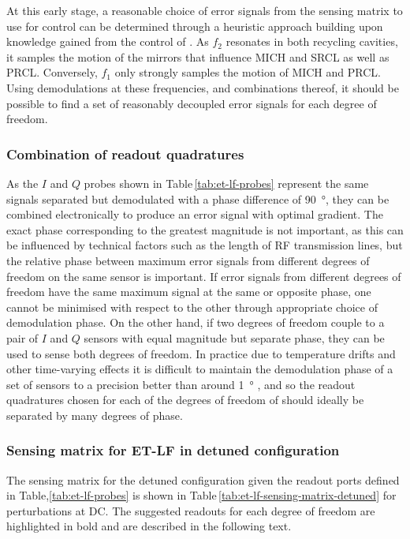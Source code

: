 At this early stage, a reasonable choice of error signals from the sensing matrix to use for control can be determined through a heuristic approach building upon knowledge gained from the control of \ALIGO{}. As $f_2$ resonates in both recycling cavities, it samples the motion of the mirrors that influence \gls{MICH} and \gls{SRCL} as well as \gls{PRCL}. Conversely, $f_1$ only strongly samples the motion of \gls{MICH} and \gls{PRCL}. Using demodulations at these frequencies, and combinations thereof, it should be possible to find a set of reasonably decoupled error signals for each degree of freedom.

\subsubsection{Combination of readout quadratures}
As the $I$ and $Q$ probes shown in Table\,\ref{tab:et-lf-probes} represent the same signals separated but demodulated with a phase difference of \SI{90}{\degree}, they can be combined electronically to produce an error signal with optimal gradient. The exact phase corresponding to the greatest magnitude is not important, as this can be influenced by technical factors such as the length of \gls{RF} transmission lines, but the relative phase between maximum error signals from different degrees of freedom on the same sensor is important. If error signals from different degrees of freedom have the same maximum signal at the same or opposite phase, one cannot be minimised with respect to the other through appropriate choice of demodulation phase. On the other hand, if two degrees of freedom couple to a pair of $I$ and $Q$ sensors with equal magnitude but separate phase, they can be used to sense both degrees of freedom. In practice due to temperature drifts and other time-varying effects it is difficult to maintain the demodulation phase of a set of sensors to a precision better than around \SI{1}{\degree} \cite{Effler2014}, and so the readout quadratures chosen for each of the degrees of freedom of \ETLF{} should ideally be separated by many degrees of phase.

\subsubsection{Sensing matrix for ET-LF in detuned configuration}
The sensing matrix for the detuned configuration given the readout ports defined in Table,\ref{tab:et-lf-probes} is shown in Table\,\ref{tab:et-lf-sensing-matrix-detuned} for perturbations at \gls{DC}. The suggested readouts for each degree of freedom are highlighted in bold and are described in the following text.

